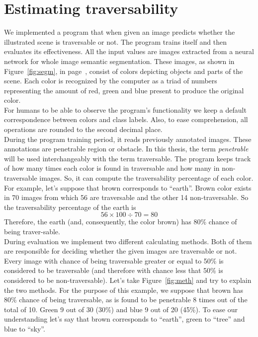\documentclass[12pt,a4paper,table,dvipsnames,tikz]{report}
\newcommand{\alleg}{\enquote}
\newcommand{\term}{\textit}
\newcommand{\bl}[1]{{\hypersetup{linkcolor=blue}#1}}
\begin{document}
	\section{Estimating traversability}
	\label{sec:fg:impl}
	
	We implemented a program that when given an image predicts whether the illustrated 
	scene is traversable or not. The program trains itself and then evaluates its 
	effectiveness. All the input values are images extracted from a neural network for whole 
	image semantic segmentation. These images, as shown in Figure~\bl{\ref{fig:segm}}, 
	in page~\bl{\pageref{fig:segm}}, consist 
	of colors depicting objects and parts of the scene. Each color is recognized by the 
	computer as a triad of numbers representing the amount of red, green and blue present 
	to produce the original color. 
	\\
	
	For humans to be able to observe the program's functionality we keep a default 
	correspondence between colors and class labels. Also, to ease comprehension, all 
	operations are rounded to the second decimal place.
	\\
	
	During the program training period, it reads previously annotated images. These 
	annotations are penetrable region or obstacle. In this thesis, the term \term{penetrable} 
	will be used interchangeably with the term traversable. The program keeps track of how many times 
	each color is found in traversable and how many in non-traversable images. So, it can 
	compute the traversability percentage of each color. For example, let's suppose that 
	brown corresponds to \alleg{earth}. Brown color 
	exists in 70 images from which 56 are traversable and the other 14 non-traversable. 
	So the traversability percentage of the earth is 
	\[ 56 \times 100 \div 70 = 80 \]
	Therefore, the earth (and, consequently, the color brown) has 80\% chance of 
	being traver-sable.
	\\
	
	During evaluation we implement two different calculating methods. Both of them are 
	responsible for deciding whether the given images are traversable or not. Every image 
	with chance of being traversable greater or equal to 50\% is considered to be traversable 
	(and therefore with chance less that 50\% is considered to be non-traversable). 
	Let's take Figure~\bl{\ref{fig:meth}} and try to explain the two methods. For the purpose
	of this example, we suppose that brown has 80\% chance of being traversable, as is found to be 
	penetrable 8 times out of the total of 10. Green 9 out of 30 (30\%) and blue 9 out 
	of 20 (45\%). To ease our understanding let's say that brown corresponds to \alleg{earth}, 
	green to \alleg{tree} and blue to \alleg{sky}. 
	\\
	
\end{document}
